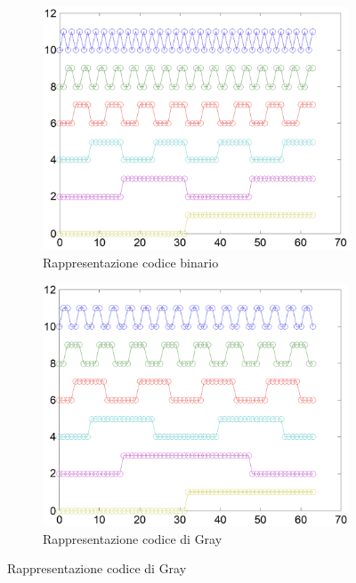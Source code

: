 \documentclass[a4paper]{extarticle}
\begin{document}
\noindent
\begin{figure}[H]
    \begin{subfigure}{0.5\textwidth}
        \centering
        \includegraphics[width=1\textwidth]{rappresentazione-codice-binario.png}
        \caption{Rappresentazione codice binario}
        \label{fig:rapp_cod_bin}
    \end{subfigure}
    \begin{subfigure}{0.5\textwidth}
        \centering
        \includegraphics[width=1\textwidth]{rappresentazione-codice-gray.png}
        \caption{Rappresentazione codice di Gray}
        \label{fig:rapp_cod_gray}
    \end{subfigure}
\end{figure}
\end{document}
